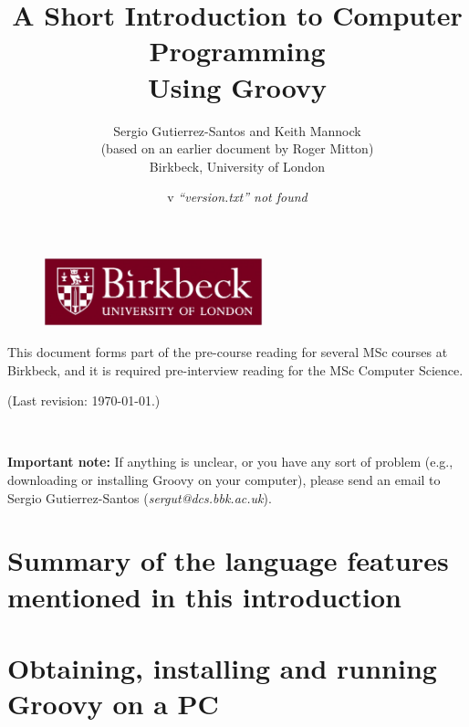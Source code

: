 \documentclass[11pt,a4paper]{article}
\title{A Short Introduction to Computer Programming\\
  Using Groovy}
\author{Sergio Gutierrez-Santos and Keith Mannock\\
  (based on an earlier document by Roger Mitton)\\
  Birkbeck, University of London}
\date{\InputIfFileExists{version.txt}
     {v}
     {\emph{``version.txt'' not found}}}
\begin{document}

\maketitle

\thispagestyle{empty}

\vfill 

\begin{figure}[h!]  %
  \centering
  \includegraphics[height=2cm]{bbk.eps}
\end{figure}

\vfill

\noindent This document forms part of the pre-course reading for
several MSc courses at Birkbeck, and it is required pre-interview
reading for the MSc Computer Science.


\noindent (Last revision: \today.)


\newpage

~\vspace{8cm}

\textbf{Important note: } If anything is unclear, or you have any 
sort of problem (e.g.,
downloading or installing Groovy on your computer), please send an
email to Sergio Gutierrez-Santos (\emph{sergut@dcs.bbk.ac.uk}).
\newpage


\newpage


\newpage


\newpage


\newpage


\newpage

\section{Summary of the language features mentioned in this introduction}

\newpage


\newpage

\section{Obtaining, installing and running Groovy on a PC}
\label{sec:obta-inst-runn}

\end{document}
